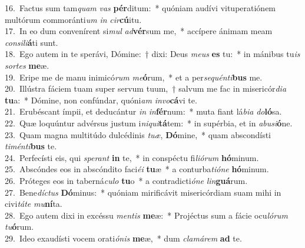 {16.~}Factus sum tam\textit{quam} \textit{vas} \textbf{pér}ditum:~* quóniam audívi vituperatiónem multórum commoránti\textit{um} \textit{in} \textit{cir}\textbf{cú}itu.\\
{17.~}In eo dum convenírent si\textit{mul} \textit{ad}\textbf{vér}sum me,~* accípere ánimam meam \textit{con}\textit{si}\textit{li}\textbf{á}ti sunt.\\
{18.~}Ego autem in te sperávi, Dómine:~† dixi: Deus \textit{me}\textit{us} \textbf{es} tu:~* in mánibus tu\textit{is} \textit{sor}\textit{tes} \textbf{me}æ.\\
{19.~}Eripe me de manu inimicó\textit{rum} \textit{me}\textbf{ó}rum,~* et a per\textit{se}\textit{quén}\textit{ti}\textbf{bus} me.\\
{20.~}Illústra fáciem tuam super servum tuum,~† salvum me fac in misericór\textit{di}\textit{a} \textbf{tu}a:~* Dómine, non confúndar, quóni\textit{am} \textit{in}\textit{vo}\textbf{cá}vi te.\\
{21.~}Erubéscant ímpii, et deducántur \textit{in} \textit{in}\textbf{fér}num:~* muta fiant lá\textit{bi}\textit{a} \textit{do}\textbf{ló}sa.\\
{22.~}Quæ loquúntur advérsus justum i\textit{ni}\textit{qui}\textbf{tá}tem:~* in supérbia, et in \textit{a}\textit{bu}\textit{si}\textbf{ó}ne.\\
{23.~}Quam magna multitúdo dulcédinis \textit{tu}\textit{æ}, \textbf{Dó}mine,~* quam abscondísti \textit{ti}\textit{mén}\textit{ti}\textbf{bus} te.\\
{24.~}Perfecísti eis, qui \textit{spe}\textit{rant} \textbf{in} te,~* in conspéctu fi\textit{li}\textit{ó}\textit{rum} \textbf{hó}minum.\\
{25.~}Abscóndes eos in abscóndito faci\textit{é}\textit{i} \textbf{tu}æ~* a conturba\textit{ti}\textit{ó}\textit{ne} \textbf{hó}minum.\\
{26.~}Próteges eos in taberná\textit{cu}\textit{lo} \textbf{tu}o~* a contradicti\textit{ó}\textit{ne} \textit{lin}\textbf{guá}rum.\\
{27.~}Bene\textit{dí}\textit{ctus} \textbf{Dó}minus:~* quóniam mirificávit misericórdiam suam mihi in civi\textit{tá}\textit{te} \textit{mu}\textbf{ní}ta.\\
{28.~}Ego autem dixi in excéssu \textit{men}\textit{tis} \textbf{me}æ:~* Projéctus sum a fácie ocu\textit{ló}\textit{rum} \textit{tu}\textbf{ó}rum.\\
{29.~}Ideo exaudísti vocem orati\textit{ó}\textit{nis} \textbf{me}æ,~* dum \textit{cla}\textit{má}\textit{rem} \textbf{ad} te.\\
